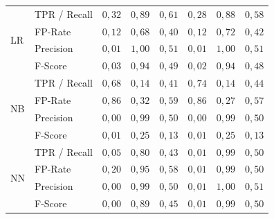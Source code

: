 \begin{table}[h!t]
{\begin{tabular}{|ll|rrr|rrr|}
\hline
\multirow{4}{*}{LR}  & TPR / Recall & $0,32$             & $0,89$                 & $0,61$                     & $0,28$             & $0,88$                 & $0,58$                      \\
                     & FP-Rate      & $0,12$             & $0,68$                 & $0,40$                     & $0,12$             & $0,72$                 & $0,42$                      \\
                     & Precision    & $0,01$             & $1,00$                 & $0,51$                     & $0,01$             & $1,00$                 & $0,51$                      \\
                     & F-Score      & $0,03$             & $0,94$                 & $0,49$                     & $0,02$             & $0,94$                 & $0,48$                      \\ 
\hline
\multirow{4}{*}{NB}  & TPR / Recall & $0,68$             & $0,14$                 & $0,41$                     & $0,74$             & $0,14$                 & $0,44$                      \\
                     & FP-Rate      & $0,86$             & $0,32$                 & $0,59$                     & $0,86$             & $0,27$                 & $0,57$                      \\
                     & Precision    & $0,00$             & $0,99$                 & $0,50$                     & $0,00$             & $0,99$                 & $0,50$                      \\
                     & F-Score      & $0,01$             & $0,25$                 & $0,13$                     & $0,01$             & $0,25$                 & $0,13$                      \\ 
\hline
\multirow{4}{*}{NN}  & TPR / Recall & $0,05$             & $0,80$                 & $0,43$                     & $0,01$             & $0,99$                 & $0,50$                      \\
                     & FP-Rate      & $0,20$             & $0,95$                 & $0,58$                     & $0,01$             & $0,99$                 & $0,50$                      \\
                     & Precision    & $0,00$             & $0,99$                 & $0,50$                     & $0,01$             & $1,00$                 & $0,51$                      \\
                     & F-Score      & $0,00$             & $0,89$                 & $0,45$                     & $0,01$             & $0,99$                 & $0,50$                      \\ 

\end{tabular}}
\end{table}
